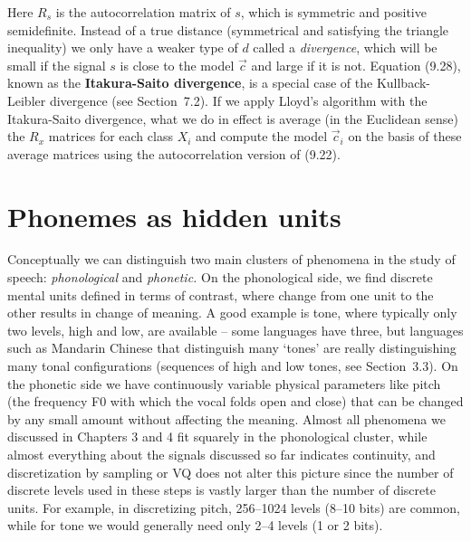 \noindent
Here $R_s$ is the autocorrelation matrix of $s$, which is symmetric and
positive semidefinite. Instead of a true distance (symmetrical and satisfying
the triangle inequality) we only have a weaker type of $d$ called a {\it
  divergence}, which will be small if the signal $s$ is close to the model
$\vec{c}$ and large if it is not. Equation (9.28), known as the {\bf
  Itakura-Saito divergence}, is a
special case of the Kullback-Leibler divergence (see Section~7.2).  If we
apply Lloyd's algorithm with the Itakura-Saito divergence, what we do in
effect is average (in the Euclidean sense) the $R_x$ matrices for each class
$X_i$ and compute the model $\vec{c}_i$ on the basis of these average matrices
using the autocorrelation version of (9.22).

\section{Phonemes as hidden units}

Conceptually we can distinguish two main clusters of phenomena in the study of
speech: {\it phonological} and {\it phonetic.} On the phonological side, we
find discrete mental units defined in terms of contrast, where change from one
unit to the other results in change of meaning. A good example is tone, where
typically only two levels, high and low, are available -- some languages have
three, but languages such as Mandarin Chinese that distinguish
many `tones' are really distinguishing many tonal configurations (sequences of
high and low tones, see Section~3.3). On the phonetic side we have
continuously variable physical parameters like pitch (the frequency F0 with
which the vocal folds open and close) that can be changed by any small amount
without affecting the meaning. Almost all phenomena we discussed in Chapters 3
and 4 fit squarely in the phonological cluster, while almost everything about
the signals discussed so far indicates continuity, and discretization by
sampling or VQ does not alter this picture since the number of discrete levels
used in these steps is vastly larger than the number of discrete units. For
example, in discretizing pitch, 256--1024 levels (8--10 bits) are common,
while for tone we would generally need only 2--4 levels (1 or 2 bits).

